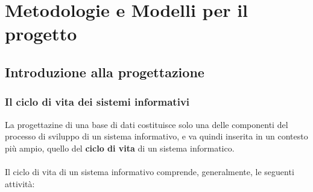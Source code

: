 \chapter{Metodologie e Modelli per il progetto}



\section{Introduzione alla progettazione}

\subsection{Il ciclo di vita dei sistemi informativi}
La progettazine di una base di dati costituisce solo una delle componenti del processo di sviluppo di un sistema informativo, e va quindi inserita in un contesto più ampio, quello del \textbf{ciclo di vita} di un sistema informatico.\\\\
Il ciclo di vita di un sistema informativo comprende, generalmente, le seguenti attività:
